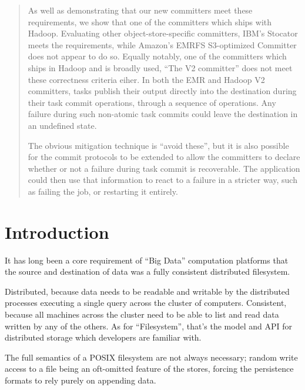 \documentclass[format=acmsmall, screen=true, nonacm, timestamp, review=false]{acmart}
\begin{document}
\begin{abstract}
As well as demonstrating that our new committers meet these requirements,
we show that one of the committers which ships with Hadoop.
Evaluating other object-store-specific committers, IBM's Stocator
meets the requirements, while Amazon's EMRFS S3-optimized Committer does not
appear to do so.
Equally notably, one of the committers which ships in Hadoop and is broadly used,
``The V2 committer'' does not meet these correctness criteria eiher.
In both the EMR and Hadoop V2 committers, tasks publish their output directly
into the destination during their task commit operations, through a sequence of
operations.
Any failure during such non-atomic task commits could leave the
destination in an undefined state.

The obvious mitigation technique is ``avoid these'', but it is also
possible for the commit protocols to be extended to allow the committers
to declare whether or not a failure during task commit is recoverable.
The application could then use that information to react to a failure
in a stricter way, such as failing the job, or restarting it entirely.

\end{abstract}

\maketitle


\section{Introduction}
\label{sec:introduction}

It has long been a core requirement of ``Big Data'' computation platforms that
the source and destination of data was a fully consistent distributed filesystem.

Distributed, because data needs to be readable and writable by the distributed
processes executing a single query across the cluster of computers.
Consistent, because all machines across the cluster need to be able to
list and read data written by any of the others.
As for ``Filesystem'', that's the model and API for distributed storage which
developers are familiar with.


The full semantics of a POSIX filesystem are not always necessary;
random write access to a file being an oft-omitted feature of the stores,
forcing the persistence formats to rely purely on appending data.
\end{document}

